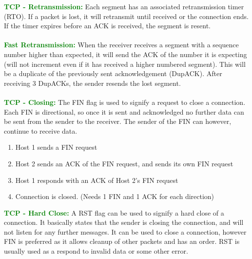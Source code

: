 \documentclass[a4paper,10pt]{article}
\begin{document}
\newpage
\noindent \textcolor{Green}{\textbf{TCP - Retransmission:}} Each segment has an associated retransmission timer (RTO). If a packet is lost, it will retransmit until received or the connection ends. If the timer expires before an ACK is received, the segment is resent. \\\\
\textcolor{Green}{\textbf{Fast Retransmission:}} When the receiver receives a segment with a sequence number higher than expected, it will send the ACK of the number it is expecting (will not increment even if it has received a higher numbered segment). This will be a duplicate of the previously sent acknowledgement (DupACK). After receiving 3 DupACKs, the sender resends the lost segment. \\\\
\textcolor{Green}{\textbf{TCP - Closing:}} The FIN flag is used to signify a request to close a connection. Each FIN is directional, so once it is sent and acknowledged no further data can be sent from the sender to the receiver. The sender of the FIN can however, continue to receive data. 
\begin{enumerate}
	\item Host 1 sends a FIN request 
	\item Host 2 sends an ACK of the FIN request, and sends its own FIN request 
	\item Host 1 responds with an ACK of Host 2's FIN request 
	\item Connection is closed. (Needs 1 FIN and 1 ACK for each direction)
\end{enumerate} 
\textcolor{Green}{\textbf{TCP - Hard Close:}} A RST flag can be used to signify a hard close of a connection. It basically states that the sender is closing the connection, and will not listen for any further messages. It can be used to close a connection, however FIN is preferred as it allows cleanup of other packets and has an order. RST is usually used as a respond to invalid data or some other error. 
\end{document}
